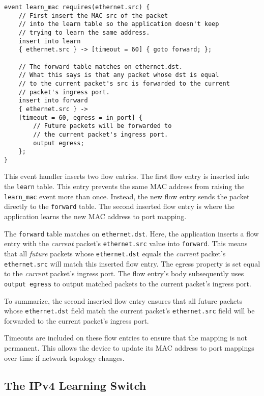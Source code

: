 \begin{codepage}
\begin{lstlisting}
event learn_mac requires(ethernet.src) {
	// First insert the MAC src of the packet
	// into the learn table so the application doesn't keep
	// trying to learn the same address.
	insert into learn
	{ ethernet.src } -> [timeout = 60] { goto forward; };

	// The forward table matches on ethernet.dst.
	// What this says is that any packet whose dst is equal
	// to the current packet's src is forwarded to the current 
	// packet's ingress port.
	insert into forward
	{ ethernet.src } ->
	[timeout = 60, egress = in_port] {
		// Future packets will be forwarded to
		// the current packet's ingress port.
		output egress;
	};
}
\end{lstlisting}
\end{codepage}

This event handler inserts two flow entries. The first flow entry is inserted into
the \texttt{learn} table. 
This entry prevents the same MAC address from raising the
\texttt{learn\_mac} event more than once.
Instead, the new flow entry sends the packet directly to the \texttt{forward} 
table.
The second inserted flow entry is where the application
learns the new MAC address to port mapping.

The \texttt{forward} table matches on \texttt{ethernet.dst}.
Here, the application inserts a flow entry with the \textit{current} packet's 
\texttt{ethernet.src} value into \texttt{forward}.
This means that all \textit{future} packets whose
\texttt{ethernet.dst} equals the \textit{current} packet's \texttt{ethernet.src}
will match this inserted flow entry. The egress property is set equal to the
\textit{current} packet's ingress port. The flow entry's body subsequently uses
\texttt{output egress} to output matched packets to the current packet's ingress port.

To summarize, the second inserted flow entry ensures that all future packets whose
\texttt{ethernet.dst} field match the current packet's \texttt{ethernet.src}
field will be forwarded to the current packet's ingress port.

Timeouts are included on these flow entries to ensure that the
mapping is not permanent. This allows the device to update its
MAC address to port mappings over time if network topology changes.

\subsection{The IPv4 Learning Switch} \label{tut:learning_router}

